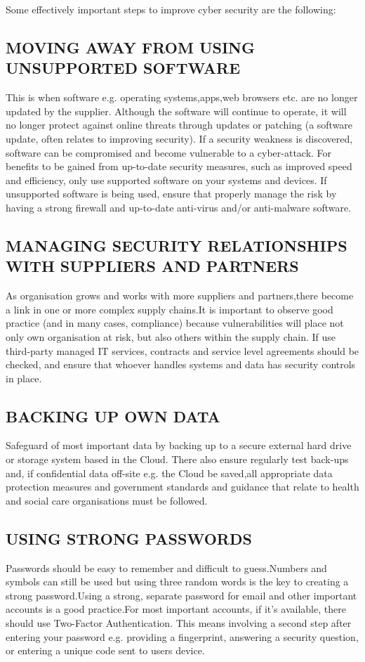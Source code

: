 \documentclass[conference,column]{IEEEtran}
\begin{document}
		
		Some effectively important steps to improve cyber security are the following:
		\subsection{MOVING AWAY FROM USING UNSUPPORTED SOFTWARE}
		This is when software e.g. operating systems,apps,web browsers etc. are no longer updated by the supplier. Although the software will continue to operate, it will no longer protect against online threats through updates or patching (a software update, often relates to improving security). If a security weakness is discovered, software can be compromised and become vulnerable to a cyber-attack. For benefits to be gained from up-to-date security measures, such as improved speed and efficiency, only use supported software on your systems and devices. If unsupported software is being used, ensure that properly manage the risk by having a strong firewall and up-to-date anti-virus and/or anti-malware software.
		\subsection{MANAGING SECURITY RELATIONSHIPS WITH SUPPLIERS AND PARTNERS}
		As organisation grows and works with more suppliers and partners,there become a link in one or more complex supply chains.It is important to observe good practice (and in many cases, compliance) because vulnerabilities will place not only own organisation at risk, but also others within the supply chain. If use third-party managed IT services, contracts and service level agreements should be checked, and ensure that whoever handles systems and data has security controls in place.
		\subsection{BACKING UP OWN DATA}
		 Safeguard of most important data by  backing up to a secure external hard drive or storage system based  in the Cloud. There also ensure regularly test back-ups and, if confidential data off-site e.g. the Cloud be saved,all appropriate data protection measures and government standards and guidance that relate to health and social care organisations must be followed.
		\subsection{USING STRONG PASSWORDS}
		Passwords should be easy to remember and difficult to guess.Numbers and symbols can still be used but using three random words is the key to creating a strong password.Using a strong, separate password for email and other important accounts is a good practice.For most important accounts, if it’s available, there should use Two-Factor Authentication. This means involving a second step after entering your password e.g. providing a fingerprint, answering a security question, or entering a unique code sent to users device. 
\end{document}
